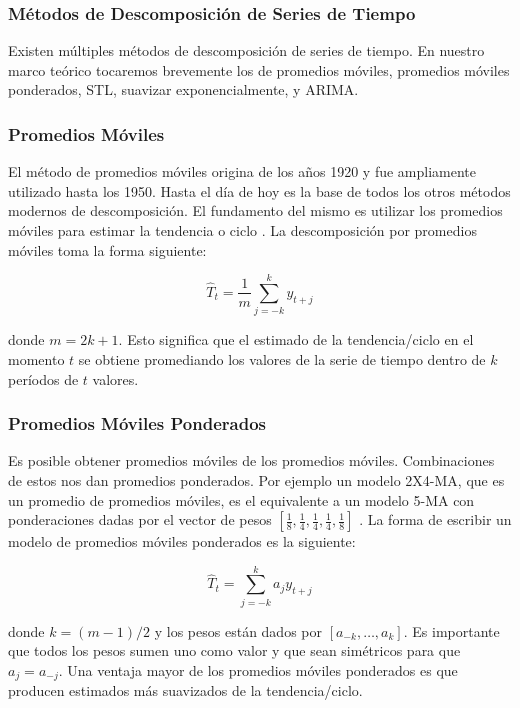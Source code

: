 \begin{spacing}{1.5}
\subsubsection{Métodos de Descomposición de Series de Tiempo}
Existen múltiples métodos de descomposición de series de tiempo. En nuestro marco teórico tocaremos brevemente los de promedios móviles, promedios móviles ponderados, STL, suavizar exponencialmente, y ARIMA.

\subsubsection{Promedios Móviles}

El método de promedios móviles origina de los años 1920 y fue ampliamente utilizado hasta los 1950. Hasta el día de hoy es la base de todos los otros métodos modernos de descomposición. El fundamento del mismo es utilizar los promedios móviles para estimar la tendencia o ciclo \cite{hyndman}. La descomposición por promedios móviles toma la forma siguiente:

\[ \hat{T}_{t} = \frac{1}{m} \sum_{j = -k}^{k} y_{t + j}  \]

donde $m=2k+1$. Esto significa que el estimado de la tendencia/ciclo en el momento $t$ se obtiene promediando los valores de la serie de tiempo dentro de $k$ períodos de $t$ valores. 

\subsubsection{Promedios Móviles Ponderados}
Es posible obtener promedios móviles de los promedios móviles. Combinaciones de estos nos dan promedios ponderados. Por ejemplo un modelo 2X4-MA, que es un promedio de promedios móviles, es el equivalente a un modelo 5-MA con ponderaciones dadas por el vector de pesos $[\frac{1}{8}, \frac{1}{4}, \frac{1}{4}, \frac{1}{4}, \frac{1}{8}]$ \cite{hyndman}. La forma de escribir un modelo de promedios móviles ponderados es la siguiente:

\[ \hat{T}_{t} = \sum_{j = -k}^{k} a_j y_{t + j}  \]

donde $k=(m-1)/2$ y los pesos están dados por $[a_{-k}, \ldots, a_{k}]$. Es importante que todos los pesos sumen uno como valor y que sean simétricos para que $a_{j} = a_{-j}$. Una ventaja mayor de los promedios móviles ponderados es que producen estimados más suavizados de la tendencia/ciclo. 


\end{spacing}
